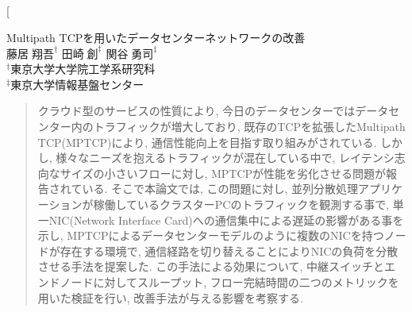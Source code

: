 \documentclass[11pt, a4paper, twocolumn]{jsarticle}
\begin{document}

\twocolumn[
\vspace{1.5cm}
\begin{center}
{\Large Multipath TCPを用いたデータセンターネットワークの改善}\\
\vspace{1em}
{\large $藤居\;翔吾^{\dagger}$ \hspace{1.0cm}$田崎\;創^{\ddagger}$ \hspace{1.0cm}
$関谷\;勇司^{\ddagger}$}\\
${}^{\dagger}$東京大学大学院工学系研究科\\
${}^{\ddagger}$東京大学情報基盤センター \\
\end{center}
\begin{quotation}
\begin{spacing}{0.6}
{\footnotesize クラウド型のサービスの性質により, 今日のデータセンターではデータセンター内のトラフィックが増大しており,
既存のTCPを拡張したMultipath TCP(MPTCP)により, 通信性能向上を目指す取り組みがされている.
しかし, 様々なニーズを抱えるトラフィックが混在している中で, レイテンシ志向なサイズの小さいフローに対し, MPTCPが性能を劣化させる問題が報告されている.
そこで本論文では, この問題に対し, 並列分散処理アプリケーションが稼働しているクラスターPCのトラフィックを観測する事で, 単一NIC(Network
Interface Card)への通信集中による遅延の影響がある事を示し, MPTCPによるデータセンターモデルのように複数のNICを持つノードが存在する環境で,
通信経路を切り替えることによりNICの負荷を分散させる手法を提案した.
この手法による効果について, 中継スイッチとエンドノードに対してスループット, フロー完結時間の二つのメトリックを用いた検証を行い,
改善手法が与える影響を考察する.
}
\end{spacing}
\end{quotation}
\end{document}

